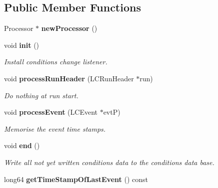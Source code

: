 \subsection*{Public Member Functions}
\begin{DoxyCompactItemize}
\item 
Processor $\ast$ {\bfseries new\-Processor} ()\label{classmarlin_1_1ConditionsDataWriter_a360478d5d28f2e5012ef5e0e5201821a}

\item 
void {\bf init} ()
\begin{DoxyCompactList}\small\item\em Install conditions change listener. \end{DoxyCompactList}\item 
void {\bf process\-Run\-Header} (L\-C\-Run\-Header $\ast$run)\label{classmarlin_1_1ConditionsDataWriter_a943dd58f7e315e2ded7f49a77211eb82}

\begin{DoxyCompactList}\small\item\em Do nothing at run start. \end{DoxyCompactList}\item 
void {\bf process\-Event} (L\-C\-Event $\ast$evt\-P)
\begin{DoxyCompactList}\small\item\em Memorise the event time stamps. \end{DoxyCompactList}\item 
void {\bf end} ()
\begin{DoxyCompactList}\small\item\em Write all not yet written conditions data to the conditions data base. \end{DoxyCompactList}\item 
long64 {\bfseries get\-Time\-Stamp\-Of\-Last\-Event} () const \label{classmarlin_1_1ConditionsDataWriter_a8c8683f0e6055c27c991a6f31d5d69a9}

\end{DoxyCompactItemize}
